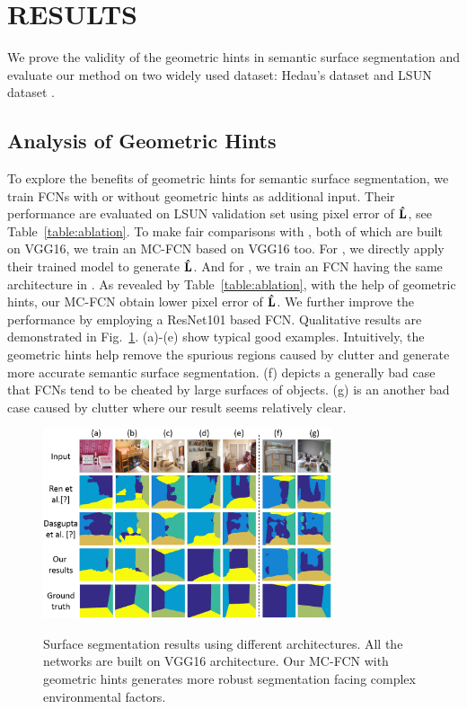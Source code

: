 \section{RESULTS}
\label{sec:Res}

We prove the validity of the geometric hints in semantic surface segmentation and evaluate our method on two widely used dataset: Hedau's dataset \cite{hedau2009recovering} and LSUN dataset \cite{zhang2015large}. 

\subsection{Analysis of Geometric Hints}
\label{sec:ablation}
To explore the benefits of geometric hints for semantic surface segmentation, we train FCNs with or without geometric hints as additional input. Their performance are evaluated on LSUN validation set using pixel error of $\mathbf{\hat{L}}$, see Table~\ref{table:ablation}. To make fair comparisons with \cite{ren2016coarse, dasgupta2016delay}, both of which are built on VGG16, we train an MC-FCN based on VGG16 too. For \cite{ren2016coarse}, we directly apply their trained model to generate $\mathbf{\hat{L}}$. And for \cite{dasgupta2016delay}, we train an FCN having the same architecture in \cite{dasgupta2016delay}. As revealed by Table~\ref{table:ablation}, with the help of geometric hints, our MC-FCN obtain lower pixel error of $\mathbf{\hat{L}}$. We further improve the performance by employing a ResNet101 based FCN. Qualitative results are demonstrated in Fig.~\ref{fig:fcn-comparison}. (a)-(e) show typical good examples. Intuitively, the geometric hints help remove the spurious regions caused by clutter and generate more accurate semantic surface segmentation. (f) depicts a generally bad case that FCNs tend to be cheated by large surfaces of objects. (g) is an another bad case caused by clutter where our result seems relatively clear.  

\begin{figure}[!ht]
	\centering 
	\textsc{\includegraphics[width=8.5cm]{figure/compare1.png}}
	\caption{Surface segmentation results using different architectures. All the networks are built on VGG16 architecture. Our MC-FCN with geometric hints generates more robust segmentation facing complex environmental factors.}
	\label{fig:fcn-comparison}
\end{figure}

